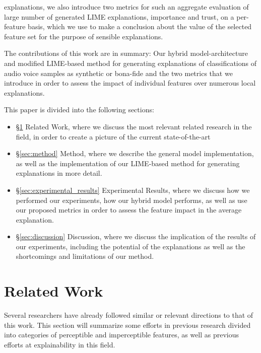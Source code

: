 \documentclass{article}
\begin{document}
	explanations, we also introduce two metrics for such an aggregate evaluation of large number
	of generated LIME explanations, importance and trust, on a per-feature basis, which we use to
	make a conclusion about the value of the selected feature set for the purpose of sensible
	explanations.
	\par
	The contributions of this work are in summary: Our hybrid model-architecture and modified
	LIME-based method for generating explanations of classifications of audio voice samples as
	synthetic or bona-fide and the two metrics that we introduce in order to assess the impact of
	individual features over numerous local explanations.
	\par
	This paper is divided into the following sections:
	\begin{itemize}
		\item §\ref{sec:related} Related Work, where we discuss the most relevant related
			research in the field, in order to create a picture of the current state-of-the-art
		\item §\ref{sec:method} Method, where we describe the general model implementation, as
			well as the implementation of our LIME-based method for generating explanations in
			more detail.
		\item §\ref{sec:experimental_results} Experimental Results, where we discuss how we performed our
			experiments, how our hybrid model performs, as well as use our proposed metrics in
			order to assess the feature impact in the average explanation.
		\item §\ref{sec:discussion} Discussion, where we discuss the implication of the results of
			our experiments, including the potential of the explanations as well as the
			shortcomings and limitations of our method.
	\end{itemize}
	\section{Related Work}
	\label{sec:related}
	Several researchers have already followed similar or relevant directions to that of this work.
	This section will summarize some efforts in previous research divided into categories of
	perceptible and imperceptible features, as well as previous efforts at explainability in this
	field.
\end{document}
